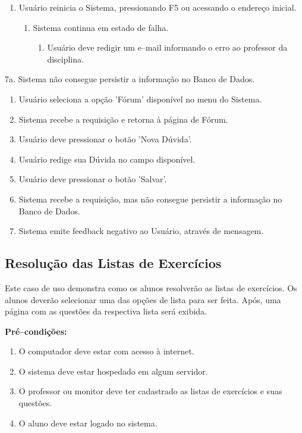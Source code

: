 \documentclass[graduacao,brazil]{ThesisPUC}
\begin{document}
\begin{enumerate}
  \item Usu\'{a}rio reinicia o Sistema, pressionando F5 ou acessando o endere\c{c}o inicial.
    \begin{enumerate}
      \item Sistema continua em estado de falha.
      \begin{enumerate}
	\item Usu\'{a}rio deve redigir um e--mail informando o erro ao professor da disciplina.
      \end{enumerate}
    \end{enumerate}
\end{enumerate}

7a. Sistema n\~{a}o consegue persistir a informa\c{c}\~{a}o no Banco de Dados.

\begin{enumerate}
  \item Usu\'{a}rio seleciona a op\c{c}\~{a}o 'F\'{o}rum' dispon\'{i}vel no menu do Sistema.
  \item Sistema recebe a requisi\c{c}\~{a}o e retorna \`{a} p\'{a}gina de F\'{o}rum.
  \item Usu\'{a}rio deve pressionar o bot\~{a}o 'Nova D\'{u}vida'.
  \item Usu\'{a}rio redige sua D\'{u}vida no campo dispon\'{i}vel.
  \item Usu\'{a}rio deve pressionar o bot\~{a}o 'Salvar'.
  \item Sistema recebe a requisi\c{c}\~{a}o, mas n\~{a}o consegue persistir a informa\c{c}\~{a}o no Banco de Dados.
  \item Sistema emite feedback negativo ao Usu\'{a}rio, atrav\'{e}s de mensagem.
\end{enumerate}

\subsection{Resolu\c{c}\~{a}o das Listas de Exerc\'{i}cios}

Este caso de uso demonstra como os alunos resolver\~{a}o as listas de exerc\'{i}cios.
Os alunos dever\~{a}o selecionar uma das op\c{c}\~{o}es de lista para ser feita.
Ap\'{o}s, uma p\'{a}gina com as quest\~{o}es da respectiva lista ser\'{a} exibida.

\textbf{Pré--condições:}

\begin{enumerate}
  \item O computador deve estar com acesso \`{a} internet.
  \item O sistema deve estar hospedado em algum servidor.
  \item O professor ou monitor deve ter cadastrado as listas de exerc\'{i}cios e suas quest\~{o}es.
  \item O aluno deve estar logado no sistema.
\end{enumerate}
\end{document}
